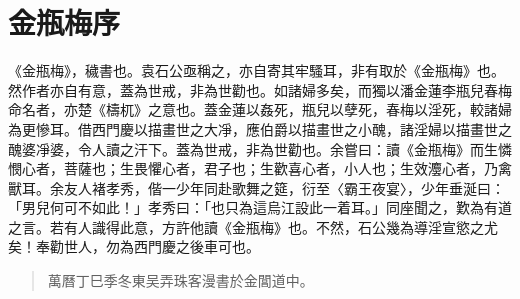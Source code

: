 \chapter*{金瓶梅序}


《金瓶梅》，穢書也。袁石公亟稱之，亦自寄其牢騷耳，非有取於《金瓶梅》也。然作者亦自有意，蓋為世戒，非為世勸也。如諸婦多矣，而獨以潘金蓮李瓶兒春梅命名者，亦楚《檮杌》之意也。蓋金蓮以姦死，瓶兒以孽死，春梅以淫死，較諸婦為更慘耳。借西門慶以描畫世之大凈，應伯爵以描畫世之小醜，諸淫婦以描畫世之醜婆凈婆，令人讀之汗下。蓋為世戒，非為世勸也。余嘗曰：讀《金瓶梅》而生憐憫心者，菩薩也；生畏懼心者，君子也；生歡喜心者，小人也；生效灋心者，乃禽獸耳。余友人褚孝秀，偕一少年同赴歌舞之筵，衍至〈霸王夜宴〉，少年垂涎曰：「男兒何可不如此！」孝秀曰：「也只為這烏江設此一着耳。」同座聞之，歎為有道之言。若有人識得此意，方許他讀《金瓶梅》也。不然，石公幾為導淫宣慾之尤矣！奉勸世人，勿為西門慶之後車可也。

\begin{quotation}\begin{flushright}萬曆丁巳季冬東吴弄珠客漫書於金閶道中。\end{flushright}\end{quotation}

